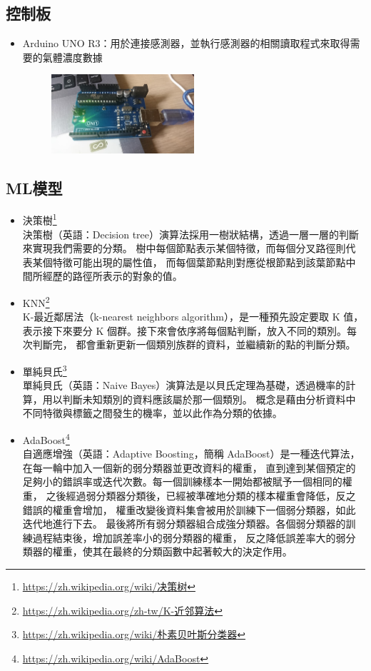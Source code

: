 	\subsection{控制板}
	\begin{itemize}
		\item Arduino UNO R3：用於連接感測器，並執行感測器的相關讀取程式來取得需要的氣體濃度數據
		\begin{figure}[H]
			\centering
			\includegraphics[width=0.5\textwidth]{pic/Uno.png}
		\end{figure}
	\end{itemize}
	\subsection{ML模型}
	\begin{itemize}
		\item 決策樹\footnote{\url{https://zh.wikipedia.org/wiki/决策树}}\\
			決策樹（英語：Decision tree）演算法採用一樹狀結構，透過一層一層的判斷來實現我們需要的分類。
			樹中每個節點表示某個特徵，而每個分叉路徑則代表某個特徵可能出現的屬性值，
			而每個葉節點則對應從根節點到該葉節點中間所經歷的路徑所表示的對象的值。
		\item KNN\footnote{\url{https://zh.wikipedia.org/zh-tw/K-近邻算法}}\\
			K-最近鄰居法（k-nearest neighbors algorithm），是一種預先設定要取 K 值，
			表示接下來要分 K 個群。接下來會依序將每個點判斷，放入不同的類別。每次判斷完，
			都會重新更新一個類別族群的資料，並繼續新的點的判斷分類。
		\item 單純貝氏\footnote{\url{https://zh.wikipedia.org/wiki/朴素贝叶斯分类器}}\\
			單純貝氏（英語：Naive Bayes）演算法是以貝氏定理為基礎，透過機率的計算，用以判斷未知類別的資料應該屬於那一個類別。
			概念是藉由分析資料中不同特徵與標籤之間發生的機率，並以此作為分類的依據。
		\item AdaBoost\footnote{\url{https://zh.wikipedia.org/wiki/AdaBoost}}\\
			自適應增強（英語：Adaptive Boosting，簡稱 AdaBoost）是一種迭代算法，在每一輪中加入一個新的弱分類器並更改資料的權重，
			直到達到某個預定的足夠小的錯誤率或迭代次數。每一個訓練樣本一開始都被賦予一個相同的權重，
			之後經過弱分類器分類後，已經被準確地分類的樣本權重會降低，反之錯誤的權重會增加，
			權重改變後資料集會被用於訓練下一個弱分類器，如此迭代地進行下去。
			最後將所有弱分類器組合成強分類器。各個弱分類器的訓練過程結束後，增加誤差率小的弱分類器的權重，
			反之降低誤差率大的弱分類器的權重，使其在最終的分類函數中起著較大的決定作用。
	\end{itemize}
